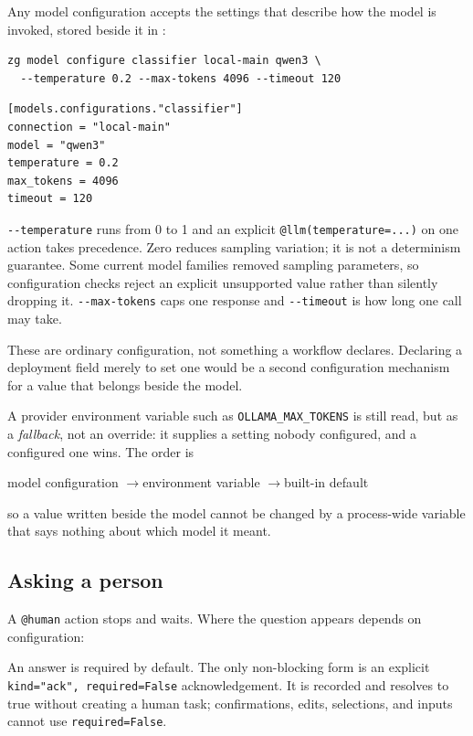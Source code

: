 \documentclass[11pt,a4paper]{article}
\begin{document}
Any model configuration accepts the settings that describe how the model is
invoked, stored beside it in :

\begin{lstlisting}[style=shell]
zg model configure classifier local-main qwen3 \
  --temperature 0.2 --max-tokens 4096 --timeout 120
\end{lstlisting}

\begin{lstlisting}
[models.configurations."classifier"]
connection = "local-main"
model = "qwen3"
temperature = 0.2
max_tokens = 4096
timeout = 120
\end{lstlisting}

\texttt{-{}-temperature} runs from 0 to 1 and an explicit
\texttt{@llm(temperature=...)} on one action takes precedence. Zero reduces
sampling variation; it is not a determinism guarantee. Some current model
families removed sampling parameters, so configuration checks reject an
explicit unsupported value rather than silently dropping it.
\texttt{-{}-max-tokens} caps one response and \texttt{-{}-timeout} is how long
one call may take.

These are ordinary configuration, not something a workflow declares. Declaring
a deployment field merely to set one would be a second configuration mechanism
for a value that belongs beside the model.

A provider environment variable such as \texttt{OLLAMA\_MAX\_TOKENS} is still
read, but as a \emph{fallback}, not an override: it supplies a setting nobody
configured, and a configured one wins. The order is

\begin{center}
model configuration \quad$\rightarrow$\quad environment variable
\quad$\rightarrow$\quad built-in default
\end{center}

so a value written beside the model cannot be changed by a process-wide
variable that says nothing about which model it meant.

\subsection{Asking a person}

A \texttt{@human} action stops and waits. Where the question appears depends on
configuration:

An answer is required by default. The only non-blocking form is an explicit
\texttt{kind="ack", required=False} acknowledgement. It is recorded and
resolves to true without creating a human task; confirmations, edits,
selections, and inputs cannot use \texttt{required=False}.
\end{document}
